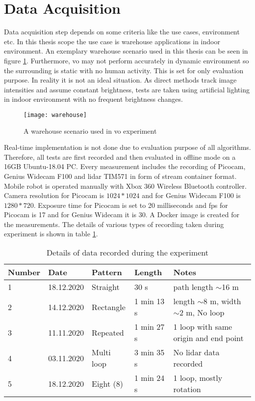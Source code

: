 \section{Data Acquisition}
Data acquisition step depends on some criteria like the use cases, environment etc. In this thesis scope the use case is warehouse applications in indoor environment. An exemplary warehouse scenario used in this thesis can be seen in figure \ref{fig:warehouse}. Furthermore, \acrshort{vo} may not perform accurately in dynamic environment so the surrounding is static with no human activity. This is set for only evaluation purpose. In reality it is not an ideal situation. As direct methods track image intensities and assume constant brightness, tests are taken using artificial lighting in indoor environment with no frequent brightness changes.
\begin{figure}[H]
	\centering
	\texttt{[image: warehouse]}
	\caption{A warehouse scenario used in \acrshort{vo} experiment}
	\label{fig:warehouse}
\end{figure}
\noindent Real-time implementation is not done due to evaluation purpose of all algorithms. Therefore, all tests are first recorded and then evaluated in offline mode on a 16GB Ubuntu-18.04 PC. Every measurement includes the recording of Picocam, Genius Widecam F100 and \acrshort{lidar} TIM571 in form of stream container format. Mobile robot is operated manually with Xbox 360 Wireless Bluetooth controller. Camera resolution for Picocam is $ 1024 * 1024 $ and for Genius Widecam F100 is $ 1280 * 720 $. Exposure time for Picocam is set to 20 milliseconds and \acrshort{fps} for Picocam is 17 and for Genius Widecam it is 30. A Docker image is created for the measurements. The details of various types of recording taken during experiment is shown in table \ref{table:recording}.
\begin{table}[H]
	\centering
	\renewcommand{\arraystretch}{1.5}
	\begin{tabular}{ l l  l  l  p{5cm} }
		
		\textbf{Number} & \textbf{Date} & \textbf{Pattern}  & \textbf{Length}  & \textbf{Notes}  \\    
		\hline
		1 & 18.12.2020 &  Straight  & 30 s & path length $\sim$16 m  \\ 
		\hline
		2 & 14.12.2020  & Rectangle & 1 min 13 s   & length $\sim$8 m, width $\sim$2 m, No loop\\ 
		\hline
		3 & 11.11.2020  & Repeated  & 1 min 27 s  & 1 loop with same origin and end point\\ 
		\hline
		4 & 03.11.2020   & Multi loop  &  3 min 35 s  & No \acrshort{lidar} data recorded \\
		\hline
		5 & 18.12.2020 & Eight (8) & 1 min 24 s &  1 loop, mostly rotation  \\
		\hline
	\end{tabular}
	\caption{Details of data recorded during the experiment}
	\label{table:recording}
\end{table}

